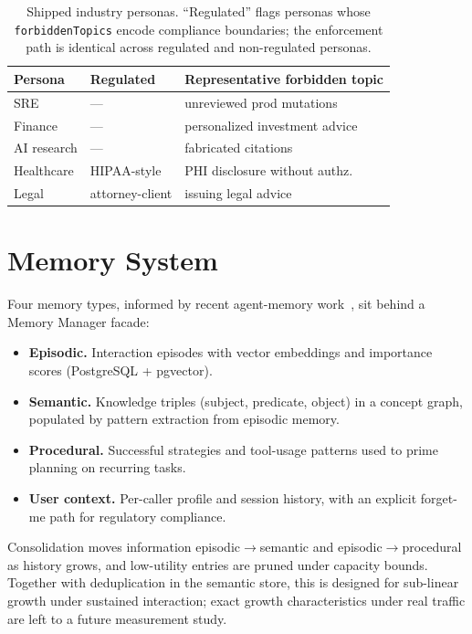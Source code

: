 \documentclass[11pt]{article}
\begin{document}
\begin{table}[t]
  \small
  \centering
  \begin{tabular}{lll}
    \toprule
    Persona & Regulated & Representative forbidden topic \\
    \midrule
    SRE           & --- & unreviewed prod mutations \\
    Finance       & --- & personalized investment advice \\
    AI research   & --- & fabricated citations \\
    Healthcare    & HIPAA-style & PHI disclosure without authz. \\
    Legal         & attorney-client & issuing legal advice \\
    \bottomrule
  \end{tabular}
  \caption{Shipped industry personas. ``Regulated'' flags personas whose \texttt{forbiddenTopics} encode compliance boundaries; the enforcement path is identical across regulated and non-regulated personas.}
  \label{tab:domains}
\end{table}

\section{Memory System}
\label{sec:memory}

Four memory types, informed by recent agent-memory work~\citep{ai2025memorybench, gallego2026memoryastool, yadav2026synapse}, sit behind a Memory Manager facade:

\begin{itemize}
\item \textbf{Episodic.} Interaction episodes with vector embeddings and importance scores (PostgreSQL + pgvector).
\item \textbf{Semantic.} Knowledge triples (subject, predicate, object) in a concept graph, populated by pattern extraction from episodic memory.
\item \textbf{Procedural.} Successful strategies and tool-usage patterns used to prime planning on recurring tasks.
\item \textbf{User context.} Per-caller profile and session history, with an explicit forget-me path for regulatory compliance.
\end{itemize}

Consolidation moves information episodic$\to$semantic and episodic$\to$procedural as history grows, and low-utility entries are pruned under capacity bounds. Together with deduplication in the semantic store, this is designed for sub-linear growth under sustained interaction; exact growth characteristics under real traffic are left to a future measurement study.
\end{document}
